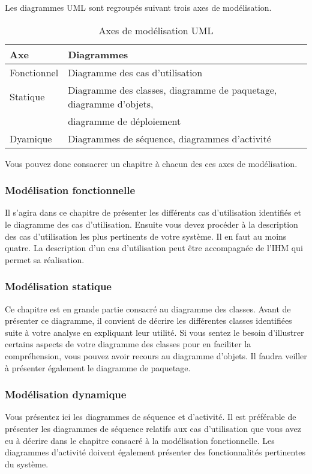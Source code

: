 \documentclass[12pt]{article}
\begin{document}
Les diagrammes UML sont regroupés suivant trois axes de modélisation.

\begin{table}[!h]
  \begin{tabular}{|l|l|}
    \hline
    \textbf{Axe} & \textbf{Diagrammes} \\
    \hline
    Fonctionnel & Diagramme des cas d'utilisation \\
    \hline
    Statique & Diagramme des classes, diagramme de paquetage, diagramme d'objets,\\
             & diagramme de déploiement \\
    \hline
    Dyamique & Diagrammes de séquence, diagrammes d'activité \\
    \hline
  \end{tabular}
  \caption{Axes de modélisation UML}
\end{table}

Vous pouvez donc consacrer un chapitre à chacun des ces axes de modélisation.

\subsubsection{Modélisation fonctionnelle}
Il s'agira dans ce chapitre de présenter les différents cas d'utilisation identifiés et le diagramme des cas d'utilisation. Ensuite vous devez procéder à la description des cas d'utilisation les plus pertinents de votre système. Il en faut au moins quatre. La description d'un cas d'utilisation peut être accompagnée de l'IHM qui permet sa réalisation.

\subsubsection{Modélisation statique}
Ce chapitre est en grande partie consacré au diagramme des classes. Avant de présenter ce diagramme, il convient de décrire les différentes classes identifiées suite à votre analyse en expliquant leur utilité. Si vous sentez le besoin d'illustrer certains aspects de votre diagramme des classes pour en faciliter la compréhension, vous pouvez avoir recours au diagramme d'objets. Il faudra veiller à présenter également le diagramme de paquetage.

\subsubsection{Modélisation dynamique}
Vous présentez ici les diagrammes de séquence et d'activité. Il est préférable de présenter les diagrammes de séquence relatifs aux cas d'utilisation que vous avez eu à décrire dans le chapitre consacré à la modélisation fonctionnelle. Les diagrammes d'activité doivent également présenter des fonctionnalités pertinentes du système.
\end{document}
